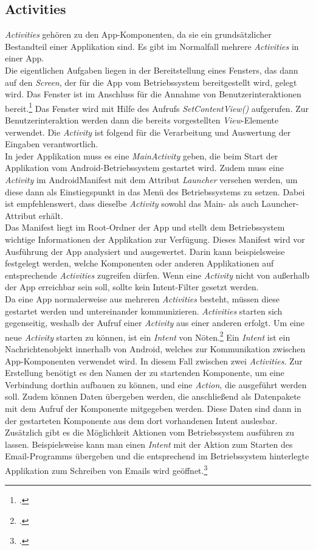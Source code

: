 \subsection{Activities}
\label{ssec:android-activities}
\textit{Activities} gehören zu den App-Komponenten, da sie ein grundsätzlicher Bestandteil einer Applikation sind. Es gibt im Normalfall mehrere \textit{Activities} in einer App.\\
Die eigentlichen Aufgaben liegen in der Bereitstellung eines Fensters, das dann auf den \textit{Screen}, der für die App vom Betriebssystem bereitgestellt wird, gelegt wird. Das Fenster ist im Anschluss für die Annahme von Benutzerinteraktionen bereit.\footcite[S. 40]{Android-BeckerPant} Das Fenster wird mit Hilfe des Aufrufs \textit{SetContentView()} aufgerufen. Zur Benutzerinteraktion werden dann die bereits vorgestellten \textit{View}-Elemente verwendet. Die \textit{Activity} ist folgend für die Verarbeitung und Auswertung der Eingaben verantwortlich.\\
In jeder Applikation muss es eine \textit{MainActivity} geben, die beim Start der Applikation vom Android-Betriebssystem gestartet wird. Zudem muss eine \textit{Activity} im AndroidManifest mit dem Attribut \textit{Launcher} versehen werden, um diese dann als Einstiegspunkt in das Menü des Betriebssystems zu setzen. Dabei ist empfehlenswert, dass dieselbe \textit{Activity} sowohl das Main- als auch Launcher-Attribut erhält.\\
Das Manifest liegt im Root-Ordner der App und stellt dem Betriebssystem wichtige Informationen der Applikation zur Verfügung. Dieses Manifest wird vor Ausführung der App analysiert und ausgewertet. Darin kann beispielsweise festgelegt werden, welche Komponenten oder anderen Applikationen auf entsprechende \textit{Activities} zugreifen dürfen. Wenn eine \textit{Activity} nicht von außerhalb der App erreichbar sein soll, sollte kein Intent-Filter gesetzt werden.\\
Da eine App normalerweise aus mehreren \textit{Activities} besteht, müssen diese gestartet werden und untereinander kommunizieren. \textit{Activities} starten sich gegenseitig, weshalb der Aufruf einer \textit{Activity} aus einer anderen erfolgt. Um eine neue \textit{Activity} starten zu können, ist ein \textit{Intent} von Nöten.\footcite[S. 135ff.]{Android-BeckerPant}
Ein \textit{Intent} ist ein Nachrichtenobjekt innerhalb von Android, welches zur Kommunikation zwischen App-Komponenten verwendet wird. In diesem Fall zwischen zwei \textit{Activities}. Zur Erstellung benötigt es den Namen der zu startenden Komponente, um eine Verbindung dorthin aufbauen zu können, und eine \textit{Action}, die ausgeführt werden soll. Zudem können Daten übergeben werden, die anschließend als Datenpakete mit dem Aufruf der Komponente mitgegeben werden. Diese Daten sind dann in der gestarteten Komponente aus dem dort vorhandenen Intent auslesbar. Zusätzlich gibt es die Möglichkeit Aktionen vom Betriebssystem ausführen zu lassen. Beispielsweise kann man einen \textit{Intent} mit der Aktion zum Starten des Email-Programms übergeben und die entsprechend im Betriebssystem hinterlegte Applikation zum Schreiben von Emails wird geöffnet.\footcite{Android-Intent}\\
